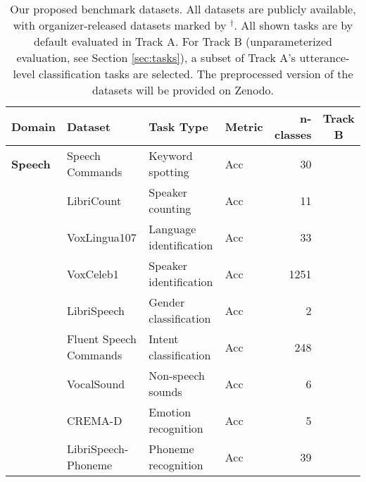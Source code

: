 \documentclass{article}
\newcommand{\cmark}{\ding{51}}%
\begin{document}
\begin{table*}[htb]
\centering
\caption{
Our proposed benchmark datasets. All datasets are publicly available, with organizer-released datasets marked by $^{\dagger}$.
All shown tasks are by default evaluated in Track A.
For Track B (unparameterized evaluation, see Section \ref{sec:tasks}), a subset of Track A's utterance-level classification tasks are selected.
The preprocessed version of the datasets will be provided on Zenodo.
}
\vspace{0.5em}
\label{tab:testset}
\begin{tabularx}{\textwidth}{Xlllrc}
\toprule
\textbf{Domain}      & \textbf{Dataset}                                             & \textbf{Task Type}                & \textbf{Metric}   & \textbf{n-classes} & \textbf{Track B} \\
\midrule
\textbf{Speech}      & Speech Commands    \cite{warden2018speech}                   & Keyword spotting                  & Acc               & 30                 & \cmark \\
                     & LibriCount \cite{stoter2018libricount}                       & Speaker counting                  & Acc               & 11                 & \cmark \\
                     & VoxLingua107 \cite{valk2021voxlingua107}                     & Language identification           & Acc               & 33                 & \cmark \\
                     & VoxCeleb1 \cite{nagrani2020voxceleb}                         & Speaker identification            & Acc               & 1251               & \cmark \\
                     & LibriSpeech \cite{panayotov2015librispeech}                  & Gender classification             & Acc               & 2                  & \cmark \\
                     & Fluent Speech Commands \cite{lugosch2019speech}              & Intent classification             & Acc               & 248                & \cmark \\
                     & VocalSound \cite{gong_vocalsound}                            & Non-speech sounds                 & Acc               & 6                  & \cmark \\
                     & CREMA-D \cite{cao2014crema}                                  & Emotion recognition               & Acc               & 5                  & \cmark \\
                     & LibriSpeech-Phoneme \cite{panayotov2015librispeech}          & Phoneme recognition               & Acc               & 39                 & \cmark \\

\end{tabularx}
\end{table*}
\end{document}
